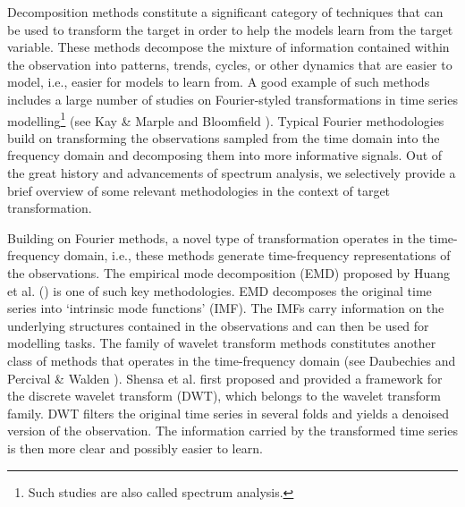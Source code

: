 Decomposition methods constitute a significant category of techniques that can be used to transform the target in order to help the models learn from the target variable. These methods decompose the mixture of information contained within the observation into patterns, trends, cycles, or other dynamics that are easier to model, i.e., easier for models to learn from. A good example of such methods includes a large number of studies on Fourier-styled transformations in time series modelling\footnote{Such studies are also called spectrum analysis.} (see Kay \& Marple \citeyear{kay1981spectrum} and Bloomfield \citeyear{bloomfield2004fourier}). Typical Fourier methodologies build on transforming the observations sampled from the time domain into the frequency domain and decomposing them into more informative signals. Out of the great history and advancements of spectrum analysis, we selectively provide a brief overview of some relevant methodologies in the context of target transformation.

Building on Fourier methods, a novel type of transformation operates in the time-frequency domain, i.e., these methods generate time-frequency representations of the observations. The empirical mode decomposition (EMD) proposed by Huang et al. (\citeyear{huang1998empirical}) is one of such key methodologies. EMD decomposes the original time series into `intrinsic mode functions' (IMF). The IMFs carry information on the underlying structures contained in the observations and can then be used for modelling tasks. The family of wavelet transform methods constitutes another class of methods that operates in the time-frequency domain (see Daubechies \citeyear{daubechies1992ten} and Percival \& Walden \citeyear{percival2000wavelet}). Shensa et al. \citeyear{shensa1992discrete} first proposed and provided a framework for the discrete wavelet transform (DWT), which belongs to the wavelet transform family. DWT filters the original time series in several folds and yields a denoised version of the observation. The information carried by the transformed time series is then more clear and possibly easier to learn.

